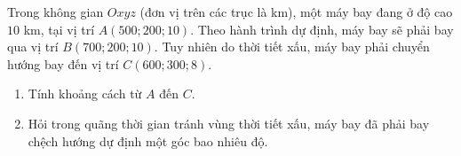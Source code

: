 \begin{bt}%
	Trong không gian $Oxyz$ (đơn vị trên các trục là km), một máy bay đang ở độ cao $10$ km, tại vị trí $A(500;200;10)$. Theo hành trình dự định, máy bay sẽ phải bay qua vị trí $B(700;200;10)$. Tuy nhiên do thời tiết xấu, máy bay phải chuyển hướng bay đến vị trí $C(600;300;8)$.
	\begin{enumerate}
		\item Tính khoảng cách từ $A$ đến $C$.
		\item Hỏi trong quãng thời gian tránh vùng thời tiết xấu, máy bay đã phải bay chệch hướng dự định một góc bao nhiêu độ.
	\end{enumerate}
\end{bt}

